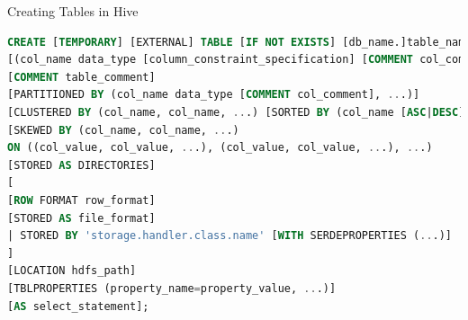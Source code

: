 \begin{frame}[fragile]{Creating Tables in Hive}
\vspace{-.7cm}
\begin{lstlisting}[caption={Create Table Commands},language=SQL]
CREATE [TEMPORARY] [EXTERNAL] TABLE [IF NOT EXISTS] [db_name.]table_name
[(col_name data_type [column_constraint_specification] [COMMENT col_comment], ... [constraint_specification])]
[COMMENT table_comment]
[PARTITIONED BY (col_name data_type [COMMENT col_comment], ...)]
[CLUSTERED BY (col_name, col_name, ...) [SORTED BY (col_name [ASC|DESC], ...)] INTO num_buckets BUCKETS]
[SKEWED BY (col_name, col_name, ...)
ON ((col_value, col_value, ...), (col_value, col_value, ...), ...)
[STORED AS DIRECTORIES]
[
[ROW FORMAT row_format] 
[STORED AS file_format]
| STORED BY 'storage.handler.class.name' [WITH SERDEPROPERTIES (...)]
]
[LOCATION hdfs_path]
[TBLPROPERTIES (property_name=property_value, ...)]
[AS select_statement];
\end{lstlisting}

\end{frame}

